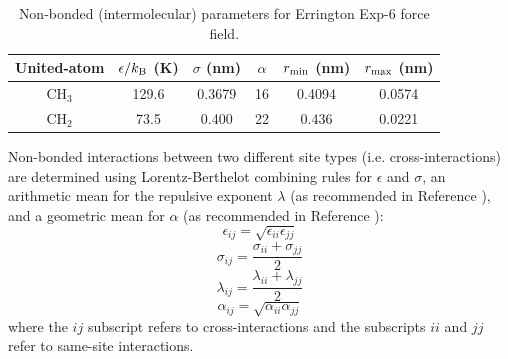 \documentclass[preprint,letterpaper,floatfix,citeautoscript,aip,jcp]{revtex4-1}
\begin{document}
\begin{table}[h!]
	\caption{Non-bonded (intermolecular) parameters for Errington Exp-6 force field. \cite{Exp6} } \label{tab:nonbonded Exp6}
	\begin{center}
		\begin{tabular}{|c|c|c|c|c|c|}
			\hline
			United-atom & $\epsilon/k_{\rm B}$ (K) & $\sigma$ (nm) & $\alpha$ & $r_{\rm min}$ (nm) & $r_{\rm max}$ (nm)  \\ \hline
			CH$_3$ & 129.6  & 0.3679 & 16 & 0.4094 & 0.0574 \\ 
			CH$_2$ & 73.5 & 0.400 & 22 & 0.436 & 0.0221 \\ \hline
		\end{tabular}
	\end{center} 
\end{table}

Non-bonded interactions between two different site types (i.e. cross-interactions) are determined using Lorentz-Berthelot combining rules \cite{Allen1987} for $\epsilon$ and $\sigma$, an arithmetic mean for the repulsive exponent $\lambda$ (as recommended in Reference ), and a geometric mean for $\alpha$ (as recommended in Reference ):
\begin{equation} \label{eq:Lorentz-Berthelot_eps}
\epsilon_{ij} = \sqrt{\epsilon_{ii} \epsilon_{jj}}
\end{equation}
\begin{equation} \label{eq:Lorentz-Berthelot_sig}
\sigma_{ij} = \frac{\sigma_{ii} + \sigma_{jj}}{2}
\end{equation}
\begin{equation} \label{eq:Lorentz-Berthelot_lam}
\lambda_{ij} = \frac{\lambda_{ii} + \lambda_{jj}}{2}
\end{equation}
\begin{equation} \label{eq:Lorentz-Berthelot_alpha}
\alpha_{ij} = \sqrt{\alpha_{ii} \alpha_{jj}}
\end{equation}
where the $ij$ subscript refers to cross-interactions and the subscripts $ii$ and $jj$ refer to same-site interactions. 
\end{document}

